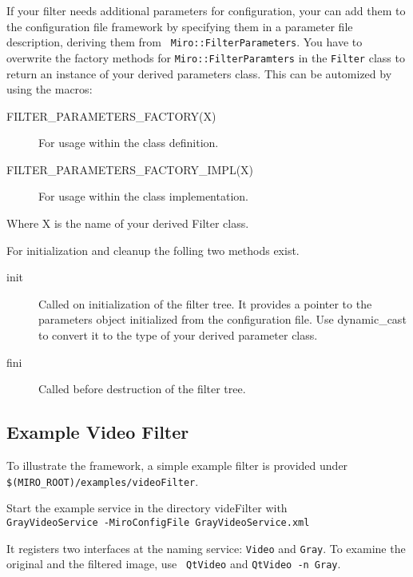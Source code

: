 If your filter needs additional parameters for configuration, your can
add them to the configuration file framework by specifying them in a
parameter file description, deriving them from {\tt
  Miro::FilterParameters}. You have to overwrite the factory methods
for {\tt Miro::FilterParamters} in the {\tt Filter} class to return an
instance of your derived parameters class. This can be automized by
using the macros:
\begin{description}
\item[FILTER_PARAMETERS_FACTORY(X)] For usage within the class definition.
\item[FILTER_PARAMETERS_FACTORY_IMPL(X)] For usage within the class implementation.
\end{description}
Where X is the name of your derived Filter class. 

For initialization and cleanup the folling two methods exist.
\begin{description}
\item[init] Called on initialization of the filter tree. It provides a
  pointer to the parameters object initialized from the configuration
  file. Use dynamic_cast to convert it to the type of your derived
  parameter class.
\item[fini] Called before destruction of the filter tree.
\end{description}

\subsection{Example Video Filter}

To illustrate the framework, a simple example filter is provided under
{\tt \$(MIRO_ROOT)/examples/videoFilter}.

Start the example service in the directory videFilter with \\
{\tt GrayVideoService -MiroConfigFile GrayVideoService.xml}

It registers two interfaces at the naming service: {\tt Video} and
{\tt Gray}. To examine the original and the filtered image, use {\tt
  QtVideo} and {\tt QtVideo -n Gray}.

